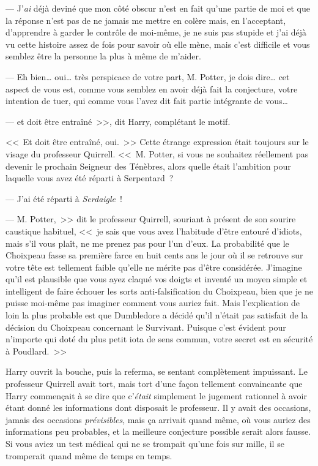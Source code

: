 --- J'\emph{ai} déjà deviné que mon côté obscur n'est en fait qu'une partie de moi et que la réponse n'est pas de ne jamais me mettre en colère mais, en l'acceptant, d'apprendre à garder le contrôle de moi-même, je ne suis pas stupide et j'ai déjà vu cette histoire assez de fois pour savoir où elle mène, mais c'est difficile et vous semblez être la personne la plus à même de m'aider.

--- Eh bien… oui… très perspicace de votre part, M. Potter, je dois dire… cet aspect de vous est, comme vous semblez en avoir déjà fait la conjecture, votre intention de tuer, qui comme vous l'avez dit fait partie intégrante de vous…

--- et doit être entraîné~>>, dit Harry, complétant le motif.

<<~Et doit être entraîné, oui.~>> Cette étrange expression était toujours sur le visage du professeur Quirrell. <<~M. Potter, si vous ne souhaitez réellement pas devenir le prochain Seigneur des Ténèbres, alors quelle était l'ambition pour laquelle vous avez été réparti à Serpentard~?

--- J'ai été réparti à \emph{Serdaigle}~!

--- M. Potter,~>> dit le professeur Quirrell, souriant à présent de son sourire caustique habituel, <<~je sais que vous avez l'habitude d'être entouré d'idiots, mais s'il vous plaît, ne me prenez pas pour l'un d'eux. La probabilité que le Choixpeau fasse sa première farce en huit cents ans le jour où il se retrouve sur votre tête est tellement faible qu'elle ne mérite pas d'être considérée. J'imagine qu'il est plausible que vous ayez claqué vos doigts et inventé un moyen simple et intelligent de faire échouer les sorts anti-falsification du Choixpeau, bien que je ne puisse moi-même pas imaginer comment vous auriez fait. Mais l'explication de loin la plus probable est que Dumbledore a décidé qu'il n'était pas satisfait de la décision du Choixpeau concernant le Survivant. Puisque c'est évident pour n'importe qui doté du plus petit iota de sens commun, votre secret est en sécurité à Poudlard.~>>

Harry ouvrit la bouche, puis la referma, se sentant complètement impuissant. Le professeur Quirrell avait tort, mais tort d'une façon tellement convaincante que Harry commençait à se dire que c'\emph{était} simplement le jugement rationnel à avoir étant donné les informations dont disposait le professeur. Il y avait des occasions, jamais des occasions \emph{prévisibles}, mais ça arrivait quand même, où vous auriez des informations peu probables, et la meilleure conjecture possible serait alors fausse. Si vous aviez un test médical qui ne se trompait qu'une fois sur mille, il se tromperait quand même de temps en temps.

